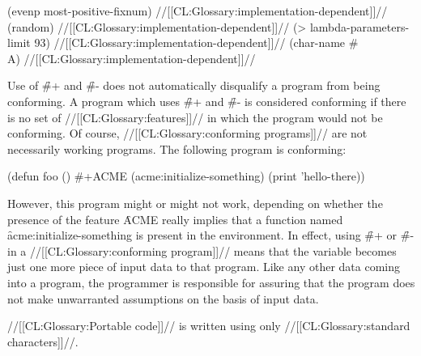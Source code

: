 \code
 (evenp most-positive-fixnum) \EV //[[CL:Glossary:implementation-dependent]]//
 (random) \EV //[[CL:Glossary:implementation-dependent]]//
 (> lambda-parameters-limit 93) \EV //[[CL:Glossary:implementation-dependent]]//
 (char-name #\\A) \EV //[[CL:Glossary:implementation-dependent]]// \endcode 

 

Use of \f{\#+} and \f{\#-} does not automatically disqualify a program from being conforming.  A program which uses \f{\#+} and \f{\#-} is  considered conforming if there is no set of //[[CL:Glossary:features]]// in which the program would not be conforming.  Of course, //[[CL:Glossary:conforming programs]]// are not necessarily working programs.  The following program is conforming:

\code (defun foo ()
  \#+ACME (acme:initialize-something)
  (print 'hello-there)) \endcode

However, this program might or might not work, depending on whether the presence of the feature \f{ACME} really implies that a function named \f{acme:initialize-something} is present in the environment.  In effect, using \f{\#+} or \f{\#-} in a //[[CL:Glossary:conforming program]]// means that the variable  becomes just one more piece of input data to that  program.  Like any other data coming into a program, the programmer is responsible for assuring that the program does not make unwarranted assumptions on the basis of input data.

\endsubsubsubsection%

\endsubsubsection%


//[[CL:Glossary:Portable code]]// is written using only //[[CL:Glossary:standard characters]]//.

\endsubsubsection%

\endsubSection%
